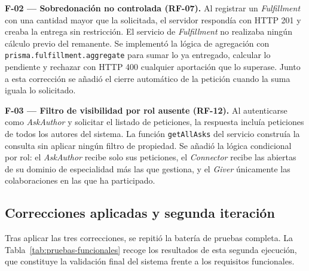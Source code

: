 \documentclass[11pt,oneside,spanish,listoffigures,listoftables]{tfgetsinf}
\begin{document}
\textbf{F-02 — Sobredonación no controlada (RF-07).} Al registrar un \textit{Fulfillment} con una cantidad mayor que la solicitada, el servidor respondía con HTTP 201 y creaba la entrega sin restricción. El servicio de \textit{Fulfillment} no realizaba ningún cálculo previo del remanente. Se implementó la lógica de agregación con \texttt{prisma.fulfillment.aggregate} para sumar lo ya entregado, calcular lo pendiente y rechazar con HTTP 400 cualquier aportación que lo superase. Junto a esta corrección se añadió el cierre automático de la petición cuando la suma iguala lo solicitado.

\textbf{F-03 — Filtro de visibilidad por rol ausente (RF-12).} Al autenticarse como \textit{AskAuthor} y solicitar el listado de peticiones, la respuesta incluía peticiones de todos los autores del sistema. La función \texttt{getAllAsks} del servicio construía la consulta sin aplicar ningún filtro de propiedad. Se añadió la lógica condicional por rol: el \textit{AskAuthor} recibe solo sus peticiones, el \textit{Connector} recibe las abiertas de su dominio de especialidad más las que gestiona, y el \textit{Giver} únicamente las colaboraciones en las que ha participado.

\subsection{Correcciones aplicadas y segunda iteración}

Tras aplicar las tres correcciones, se repitió la batería de pruebas completa. La Tabla~\ref{tab:pruebas-funcionales} recoge los resultados de esta segunda ejecución, que constituye la validación final del sistema frente a los requisitos funcionales.
\end{document}
